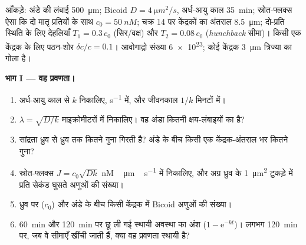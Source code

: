 \begin{problem}
\label{pb:b3:developmental-genetics:1}
आँकड़े: अंडे की लंबाई \qty{500}{\micro m}; Bicoid $D = \qty{4}{\micro m^2/s}$,
अर्ध-आयु काल \qty{35}{min}; स्रोत-फ्लक्स ऐसा कि दो मातृ प्रतियों के साथ
$c_{0} = \qty{50}{nM}$; चक्र 14 पर केंद्रकों का अंतराल
\qty{8.5}{\micro m}; दो-प्रति स्थिति के लिए देहलियाँ
$T_{1} = 0.3\,c_{0}$ (सिर/वक्ष) और $T_{2} =
0.08\,c_{0}$ (\emph{hunchback} सीमा)। किसी एक केंद्रक के लिए पठन-शोर
$\delta c/c = 0.1$। आवोगाद्रो संख्या
\qty{6e23}{}; कोई केंद्रक \qty{3}{\micro m} त्रिज्या का गोला है।

\medskip
\noindent\textbf{भाग I --- वह प्रवणता।}
\begin{enumerate}
  \item अर्ध-आयु काल से $k$ निकालिए, \unit{s^{-1}} में, और जीवनकाल
        $1/k$ मिनटों में।
  \item $\lambda = \sqrt{D/k}$ माइक्रोमीटरों में निकालिए। वह अंडा कितनी
        क्षय-लंबाइयों का है?
  \item सांद्रता ध्रुव से ध्रुव तक कितने गुना गिरती है? अंडे के बीच
        किसी एक केंद्रक-अंतराल भर कितने गुना?
  \item स्रोत-फ्लक्स $J = c_{0}\sqrt{Dk}$
        \unit{nM\,\micro m\,s^{-1}} में निकालिए, और अग्र ध्रुव के
        \qty{1}{\micro m^2} टुकड़े में प्रति सेकंड घुसते अणुओं की
        संख्या।
  \item ध्रुव पर ($c_{0}$) और अंडे के बीच किसी केंद्रक में Bicoid
        अणुओं की संख्या।
  \item \qty{60}{min} और \qty{120}{min} पर छू ली गई स्थायी अवस्था का
        अंश ($1 - \mathrm{e}^{-kt}$)। लगभग \qty{120}{min} पर, जब वे
        सीमाएँ खींची जाती हैं, क्या वह प्रवणता स्थायी है?
\end{enumerate}


\end{problem}
